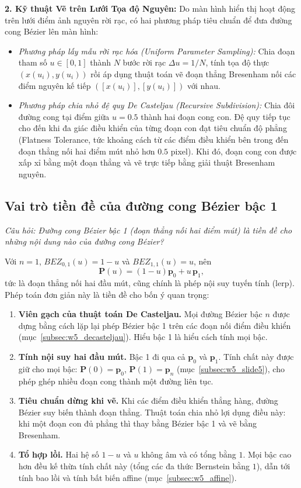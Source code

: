 \textbf{2. Kỹ thuật Vẽ trên Lưới Tọa độ Nguyên:}
Do màn hình hiển thị hoạt động trên lưới điểm ảnh nguyên rời rạc, có hai phương pháp tiêu chuẩn để đưa đường cong Bézier lên màn hình:
\begin{itemize}
    \item \textit{Phương pháp lấy mẫu rời rạc hóa (Uniform Parameter Sampling):} Chia đoạn tham số $u \in [0, 1]$ thành $N$ bước rời rạc $\Delta u = 1 / N$, tính tọa độ thực $(x(u_i), y(u_i))$ rồi áp dụng thuật toán vẽ đoạn thẳng Bresenham nối các điểm nguyên kế tiếp $([x(u_i)], [y(u_i)])$ với nhau.
    \item \textit{Phương pháp chia nhỏ đệ quy De Casteljau (Recursive Subdivision):} Chia đôi đường cong tại điểm giữa $u = 0.5$ thành hai đoạn cong con. Đệ quy tiếp tục cho đến khi đa giác điều khiển của từng đoạn con đạt tiêu chuẩn độ phẳng (Flatness Tolerance, tức khoảng cách từ các điểm điều khiển bên trong đến đoạn thẳng nối hai điểm mút nhỏ hơn $0.5$ pixel). Khi đó, đoạn cong con được xấp xỉ bằng một đoạn thẳng và vẽ trực tiếp bằng giải thuật Bresenham nguyên.
\end{itemize}

\subsection{Vai trò tiền đề của đường cong Bézier bậc 1}
\label{subsec:w5_degree1}

\textit{Câu hỏi: Đường cong Bézier bậc 1 (đoạn thẳng nối hai điểm mút) là tiền đề cho những nội dung nào của đường cong Bézier?}

Với $n = 1$, $BEZ_{0,1}(u) = 1 - u$ và $BEZ_{1,1}(u) = u$, nên
\begin{equation}
\mathbf{P}(u) = (1 - u)\mathbf{p}_0 + u\,\mathbf{p}_1,
\end{equation}
tức là đoạn thẳng nối hai đầu mút, cũng chính là phép nội suy tuyến tính (lerp). Phép toán đơn giản này là tiền đề cho bốn ý quan trọng:
\begin{enumerate}
    \item \textbf{Viên gạch của thuật toán De Casteljau.} Mọi đường Bézier bậc $n$ được dựng bằng cách lặp lại phép Bézier bậc 1 trên các đoạn nối điểm điều khiển (mục~\ref{subsec:w5_decasteljau}). Hiểu bậc 1 là hiểu cách tính mọi bậc.
    \item \textbf{Tính nội suy hai đầu mút.} Bậc 1 đi qua cả $\mathbf{p}_0$ và $\mathbf{p}_1$. Tính chất này được giữ cho mọi bậc: $\mathbf{P}(0) = \mathbf{p}_0$, $\mathbf{P}(1) = \mathbf{p}_n$ (mục~\ref{subsec:w5_slide5}), cho phép ghép nhiều đoạn cong thành một đường liên tục.
    \item \textbf{Tiêu chuẩn dừng khi vẽ.} Khi các điểm điều khiển thẳng hàng, đường Bézier suy biến thành đoạn thẳng. Thuật toán chia nhỏ lợi dụng điều này: khi một đoạn con đủ phẳng thì thay bằng Bézier bậc 1 và vẽ bằng Bresenham.
    \item \textbf{Tổ hợp lồi.} Hai hệ số $1 - u$ và $u$ không âm và có tổng bằng $1$. Mọi bậc cao hơn đều kế thừa tính chất này (tổng các đa thức Bernstein bằng $1$), dẫn tới tính bao lồi và tính bất biến affine (mục~\ref{subsec:w5_affine}).
\end{enumerate}

